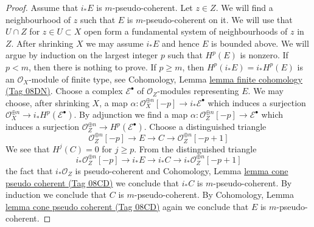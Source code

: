 \documentclass{amsart}
\theoremstyle{plain}
\theoremstyle{definition}
\theoremstyle{remark}
\numberwithin{equation}{subsection}
\begin{document}
\begin{proof}
\medskip\noindent
Assume that $i_*E$ is $m$-pseudo-coherent. Let $z \in Z$.
We will find a neighbourhood of $z$ such that $E$
is $m$-pseudo-coherent on it. We will use
that $U \cap Z$ for $z \in U \subset X$ open form a fundamental system of
neighbourhoods of $z$ in $Z$. After shrinking $X$ we may assume $i_*E$
and hence $E$ is bounded above. We will argue by induction on
the largest integer $p$ such that $H^p(E)$ is nonzero. If $p < m$, then
there is nothing to prove. If $p \geq m$, then $H^p(i_*E) = i_*H^p(E)$
is an $\mathcal{O}_X$-module of finite type, see
Cohomology, Lemma \href{https://stacks.math.columbia.edu/tag/08DN}{lemma finite cohomology (Tag 08DN)}.
Choose a complex $\mathcal{E}^\bullet$ of $\mathcal{O}_Z$-modules
representing $E$. We may choose, after shrinking $X$,
a map $\alpha : \mathcal{O}_X^{\oplus n}[-p] \to i_*\mathcal{E}^\bullet$
which induces a surjection
$\mathcal{O}_X^{\oplus n} \to i_*H^p(\mathcal{E}^\bullet)$.
By adjunction we find a map
$\alpha : \mathcal{O}_Z^{\oplus n}[-p] \to \mathcal{E}^\bullet$
which induces a surjection
$\mathcal{O}_Z^{\oplus n} \to H^p(\mathcal{E}^\bullet)$.
Choose a distinguished triangle
$$
\mathcal{O}_Z^{\oplus n}[-p] \to E \to C \to \mathcal{O}_Z^{\oplus n}[-p + 1]
$$
We see that $H^j(C) = 0$ for $j \geq p$. From the distinguished triangle
$$
i_*\mathcal{O}_Z^{\oplus n}[-p] \to i_*E \to i_*C \to
i_*\mathcal{O}_Z^{\oplus n}[-p + 1]
$$
the fact that $i_*\mathcal{O}_Z$ is pseudo-coherent
and 
Cohomology, Lemma \href{https://stacks.math.columbia.edu/tag/08CD}{lemma cone pseudo coherent (Tag 08CD)}
we conclude that $i_*C$ is $m$-pseudo-coherent.
By induction we conclude that $C$ is $m$-pseudo-coherent.
By Cohomology, Lemma \href{https://stacks.math.columbia.edu/tag/08CD}{lemma cone pseudo coherent (Tag 08CD)}
again we conclude that $E$ is $m$-pseudo-coherent.
\end{proof}
\end{document}
